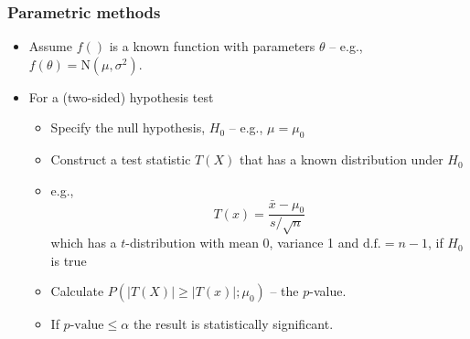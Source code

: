 \documentclass[ignorenonframetext]{beamer} %
\newcommand{\bi}{\begin{itemize}}
\newcommand{\ei}{\end{itemize}}
\begin{document}
\begin{frame}
	\frametitle{Parametric methods}
	\bi
		\item Assume $f()$ is a known function with parameters $\theta$ -- e.g., $f(\theta)=\mbox{N}(\mu,\sigma^2)$.
		\item For a (two-sided) hypothesis test
		\bi
		  \item Specify the null hypothesis, $H_0$ -- e.g., $\mu=\mu_0$
			\item Construct a test statistic $T(X)$ that has a known distribution under $H_0$
			\item e.g.,
			\begin{equation*}
			    T(x) = \frac{\bar{x}-\mu_0}{s/\sqrt{n}}
			\end{equation*}
			which has a $t$-distribution with mean 0, variance 1 and $\mbox{d.f.}=n-1$, if $H_0$ is true
			\item Calculate $P(\left|T(X)\right| \geq \left|T(x)\right|;\mu_0)$ -- the $p$-value.
			\item If $p\mbox{-value} \leq \alpha$ the result is statistically significant.
		\ei
	\ei
\end{frame}
\end{document}
